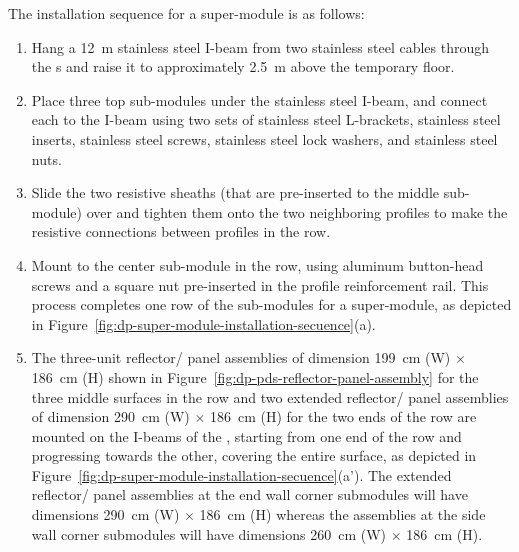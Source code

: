 The installation sequence for a super-module is as follows:
\begin{enumerate}
    \item Hang a \SI{12}{\m} stainless steel I-beam from two stainless steel cables through the \fdth{}s and raise it to approximately \SI{2.5}{\m} above the temporary floor.
    \item Place three top sub-modules under the stainless steel I-beam, and connect each to the I-beam using two sets of stainless steel L-brackets, stainless steel inserts, stainless steel screws, stainless steel lock washers, and stainless steel nuts.  
    \item Slide the two resistive sheaths (that are pre-inserted to the middle sub-module) over and tighten them onto the two neighboring profiles to make the resistive connections between profiles in the row. 
    \item Mount  to the center sub-module in the row, using aluminum button-head screws and a square nut pre-inserted in the profile reinforcement rail. This process completes one row of the sub-modules for a super-module, as depicted in Figure~\ref{fig:dp-super-module-installation-secuence}(a). 
    \item {} The three-unit  reflector/ panel assemblies of dimension \SI{199}{\cm} (W) $\times$ \SI{186}{\cm} (H) shown in Figure~\ref{fig:dp-pds-reflector-panel-assembly} for the three middle surfaces in the row and two extended  reflector/ panel assemblies of dimension \SI{290}{\cm} (W) $\times$ \SI{186}{\cm} (H) for the two ends of the row are mounted on the  I-beams of the , starting from one end of the row and progressing towards the other, covering the entire surface, as depicted in Figure~\ref{fig:dp-super-module-installation-secuence}(a'). The extended  reflector/ panel assemblies at the end wall corner  submodules will have dimensions \SI{290}{\cm} (W) $\times$ \SI{186}{\cm} (H) whereas the assemblies at the side wall corner  submodules will have dimensions \SI{260}{\cm} (W) $\times$ \SI{186}{\cm} (H).
    

\end{enumerate}
